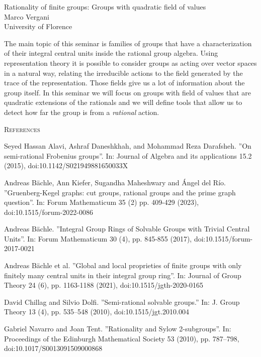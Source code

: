 \documentclass[12pt,a4paper]{article}
\begin{document}
\thispagestyle{empty} 
\begin{center}
{\large  Rationality of finite groups: Groups with quadratic field of values}\\
\vspace*{.5cm}
Marco Vergani\\
University of Florence\\
\end{center}
\vspace*{.8cm}

The main topic of this seminar is families of groups that have a characterization of their integral central units inside the rational group algebra. 
Using representation theory it is possible to consider groups as acting over vector spaces in a natural way, relating the irreducible actions to the field generated by the trace of the representation. Those fields give us a lot of information about the group itself. In this seminar we will focus on groups with field of values that are quadratic extensions of the rationals and we will define tools that allow us to detect how far the group is from a \emph{rational} action.

\bigskip
\textsc{References}

\begin{enumerate}[label={[\arabic*]}]
\item Seyed Hassan Alavi, Ashraf Daneshkhah, and Mohammad Reza Darafsheh. ''On semi-rational Frobenius groups''. In: Journal of Algebra and its applications 15.2 (2015), doi:10.1142/S021949881650033X
\item  Andreas B\"achle, Ann Kiefer, Sugandha Maheshwary and \'Angel del R\'io. ''Gruenberg-Kegel graphs: cut groups, rational groups and the prime graph question''. In: Forum Mathematicum 35 (2) pp. 409-429 (2023), doi:10.1515/forum-2022-0086
\item Andreas B\"achle. ''Integral Group Rings of Solvable Groups with Trivial Central Units''. In: Forum Mathematicum 30 (4), pp. 845-855 (2017), doi:10.1515/forum-2017-0021
\item Andreas B\"achle et al. ''Global and local proprieties of finite groups with only finitely many central units in their integral group ring''. In: Journal of Group Theory 24 (6), pp. 1163-1188 (2021), doi:10.1515/jgth-2020-0165
\item David Chillag and Silvio Dolfi. ''Semi-rational solvable groups.'' In: J. Group Theory 13 (4), pp. 535–548 (2010), doi:10.1515/jgt.2010.004
\item Gabriel Navarro and Joan Tent. ''Rationality and Sylow 2-subgroups''. In: Proceedings of the Edinburgh Mathematical Society 53 (2010), pp. 787–798, doi:10.1017/S0013091509000868
\end{enumerate}
\end{document}
